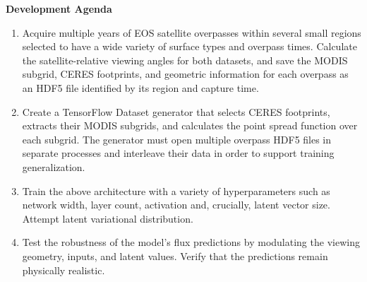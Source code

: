 \documentclass[11pt]{article}
\begin{document}
\noindent
{\large\textbf{Development Agenda}}

\vspace{-1em}

\begin{enumerate}[itemsep=0pt, parsep=0pt, before=\setlength{\baselineskip}{6mm}]
    \item Acquire multiple years of EOS satellite overpasses within several small regions selected to have a wide variety of surface types and overpass times. Calculate the satellite-relative viewing angles for both datasets, and save the MODIS subgrid, CERES footprints, and geometric information for each overpass as an HDF5 file identified by its region and capture time.
    \item Create a TensorFlow Dataset generator that selects CERES footprints, extracts their MODIS subgrids, and calculates the point spread function over each subgrid. The generator must open multiple overpass HDF5 files in separate processes and interleave their data in order to support training generalization.
    \item Train the above architecture with a variety of hyperparameters such as network width, layer count, activation and, crucially, latent vector size. Attempt latent variational distribution.
    \item Test the robustness of the model's flux predictions by modulating the viewing geometry, inputs, and latent values. Verify that the predictions remain physically realistic.
\end{enumerate}



\newpage


\end{document}
